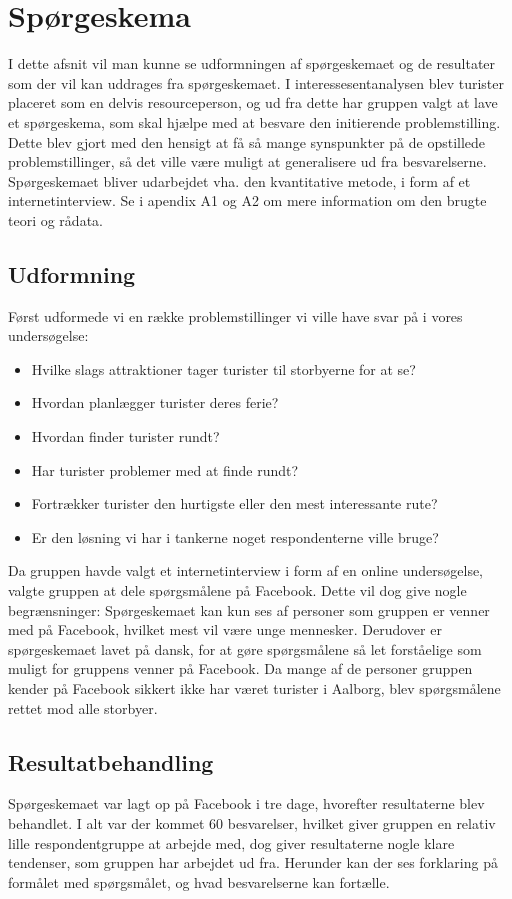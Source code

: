 \section{Spørgeskema}
I dette afsnit vil man kunne se udformningen af spørgeskemaet og de resultater som der vil kan uddrages fra spørgeskemaet. I interessesentanalysen blev turister placeret som en delvis resourceperson, og ud fra dette har gruppen valgt at lave et spørgeskema, som skal hjælpe med at besvare den initierende problemstilling. Dette blev gjort med den hensigt at få så mange synspunkter på de opstillede problemstillinger, så det ville være muligt at generalisere ud fra besvarelserne. Spørgeskemaet bliver udarbejdet vha. den kvantitative metode, i form af et internetinterview. Se i apendix A1 og A2 om mere information om den brugte teori og rådata.

\subsection{Udformning}
Først udformede vi en række problemstillinger vi ville have svar på i vores undersøgelse: 
\begin{itemize}
\item Hvilke slags attraktioner tager turister til storbyerne for at se?
\item Hvordan planlægger turister deres ferie?
\item Hvordan finder turister rundt?
\item Har turister problemer med at finde rundt?
\item Fortrækker turister den hurtigste eller den mest interessante rute?
\item Er den løsning vi har i tankerne noget respondenterne ville bruge?
\end{itemize}
Da gruppen havde valgt et internetinterview i form af en online undersøgelse, valgte gruppen at dele spørgsmålene på Facebook. Dette vil dog give nogle begrænsninger: Spørgeskemaet kan kun ses af personer som gruppen er venner med på Facebook, hvilket mest vil være unge mennesker. Derudover er spørgeskemaet lavet på dansk, for at gøre spørgsmålene så let forståelige som muligt for gruppens venner på Facebook. Da mange af de personer gruppen kender på Facebook sikkert ikke har været turister i Aalborg, blev spørgsmålene rettet mod alle storbyer.
\subsection{Resultatbehandling}
Spørgeskemaet var lagt op på Facebook i tre dage, hvorefter resultaterne blev behandlet. I alt var der kommet 60 besvarelser, hvilket giver gruppen en relativ lille respondentgruppe at arbejde med, dog giver resultaterne nogle klare tendenser, som gruppen har arbejdet ud fra. Herunder kan der ses forklaring på formålet med spørgsmålet, og hvad besvarelserne kan fortælle.

